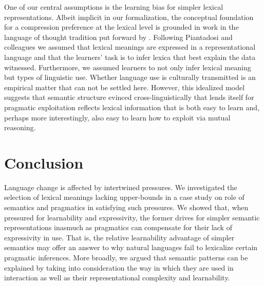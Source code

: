 \documentclass[a4paper]{article}
\begin{document}
One of our central  assumptions is the learning bias for simpler lexical representations. Albeit implicit in our formalization, the conceptual foundation for a compression preference at the lexical level is grounded in work in the language of thought tradition put forward by \citet{piantadosi+etal:2012a,piantadosi+etal:underreview}. Following Piantadosi and colleagues we assumed that lexical meanings are expressed in a representational language and that the learners' task is to infer lexica that best explain the data witnessed. Furthermore, we assumed learners to not only infer lexical meaning but types of linguistic use. Whether language use is culturally transmitted is an empirical matter that can not be settled here. However, this idealized model suggests that semantic structure evinced cross-linguistically that lends itself for pragmatic exploitation reflects lexical information that is both easy to learn and, perhaps more interestingly, also easy to learn how to exploit via mutual reasoning.



\section{Conclusion}
Language change is affected by intertwined pressures. We investigated the selection of lexical meanings lacking upper-bounds in a case study on role of semantics and pragmatics in satisfying such pressures. We showed that, when pressured for learnability and expressivity, the former drives for simpler semantic representations inasmuch as pragmatics can compensate for their lack of expressivity in use. That is, the relative learnability advantage of simpler semantics may offer an answer to why natural languages fail to lexicalize certain pragmatic inferences. More broadly, we argued that semantic patterns can be explained by taking into consideration the way in which they are used in interaction as well as their representational complexity and learnability.





\newpage
\end{document}
